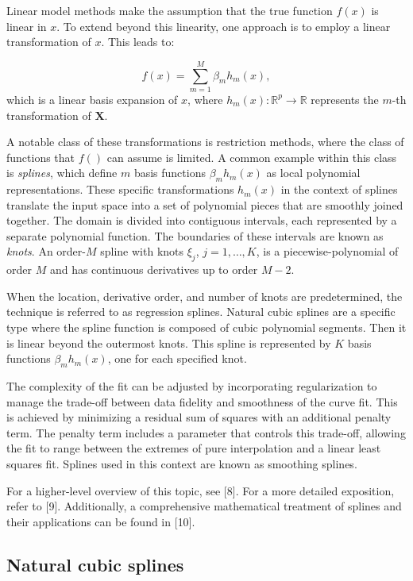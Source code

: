 \documentclass[
11pt, %
oneside, %
english, %
singlespacing, %
]{macthesis} %
\begin{document}
Linear model methods make the assumption that the true function \(f(x)\) is linear in \(x\). To extend beyond this linearity, one approach is to employ a linear transformation of \(x\). This leads to:

\[
f(x) = \sum_{m=1}^{M}\beta_m h_m(x),
\]
which is a linear basis expansion of \(x\),
where \(h_m(x): \mathbb{R}^{p} \to \mathbb{R}\) represents the \(m\)-th transformation of \(\mathbf{X}\).

A notable class of these transformations is restriction methods, where the class of functions that \(f()\) can assume is limited. A common example within this class is \emph{splines}, which define \(m\) basis functions \(\beta_m h_m(x)\) as local polynomial representations. These specific transformations \(h_m(x)\) in the context of splines translate the input space into a set of polynomial pieces that are smoothly joined together. The domain is divided into contiguous intervals, each represented by a separate polynomial function. The boundaries of these intervals are known as \emph{knots}. An order-\(M\) spline with knots \(\xi_j\), \(j = 1,\dots, K\), is a piecewise-polynomial of order \(M\) and has continuous derivatives up to order \(M-2\).

When the location, derivative order, and number of knots are predetermined, the technique is referred to as regression splines. Natural cubic splines are a specific type where the spline function is composed of cubic polynomial segments. Then it is linear beyond the outermost knots. This spline is represented by \(K\) basis functions \(\beta_m h_m(x)\), one for each specified knot.

The complexity of the fit can be adjusted by incorporating regularization to manage the trade-off between data fidelity and smoothness of the curve fit. This is achieved by minimizing a residual sum of squares with an additional penalty term. The penalty term includes a parameter that controls this trade-off, allowing the fit to range between the extremes of pure interpolation and a linear least squares fit. Splines used in this context are known as smoothing splines.

For a higher-level overview of this topic, see {[}8{]}. For a more detailed exposition, refer to {[}9{]}. Additionally, a comprehensive mathematical treatment of splines and their applications can be found in {[}10{]}.

\subsection{Natural cubic splines}\label{Natural-cubic-splines}
\end{document}
